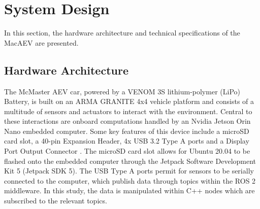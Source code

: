 \documentclass[conference]{IEEEtran}
\begin{document}



\section{System Design}





In this section, the hardware architecture and technical specifications of the MacAEV are presented.

\subsection{Hardware Architecture}

The McMaster AEV car, powered by a VENOM 3S lithium-polymer (LiPo) Battery, is built on an ARMA GRANITE 4x4 vehicle platform and consists of a multitude of sensors and actuators to interact with the environment. Central to these interactions are onboard computations handled by an Nvidia Jetson Orin Nano embedded computer. Some key features of this device include a microSD card slot, a 40-pin Expansion Header, 4x USB 3.2 Type A ports and a Display Port Output Connector \cite{b5}. The microSD card slot allows for Ubuntu 20.04 to be flashed onto the embedded computer through the Jetpack Software Development Kit 5 (Jetpack SDK 5). The USB Type A ports permit for sensors to be serially connected to the computer, which publish data through topics within the ROS 2 middleware. In this study, the data is manipulated within C++ nodes which are subscribed to the relevant topics. 
\end{document}

